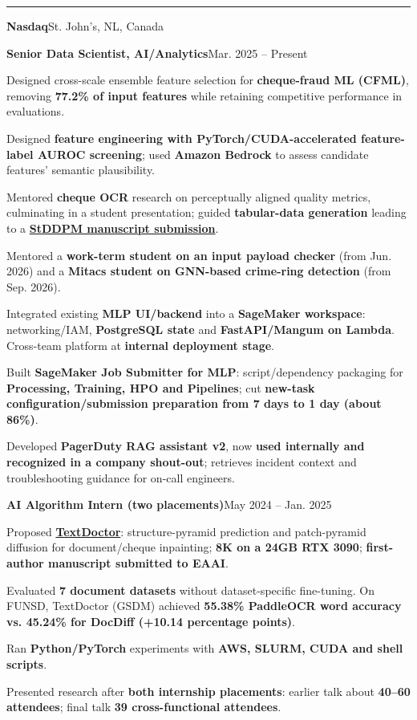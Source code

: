 \documentclass[11pt,letterpaper]{article}
\newcommand{\cvsection}[1]{\par\addvspace{6pt}{\large\bfseries #1}\par\vspace{1pt}\hrule\vspace{3pt}}
\newcommand{\company}[2]{\par\addvspace{4pt}\textbf{#1}\hfill{\small\color{muted}#2}\par}
\newcommand{\position}[2]{\par\addvspace{2pt}\textbf{#1}\hfill{\small #2}\par}
\newenvironment{points}{\begin{list}{\textbullet}{\setlength{\leftmargin}{12pt}\setlength{\itemsep}{1.2pt}\setlength{\parsep}{0pt}\setlength{\topsep}{1.5pt}\setlength{\partopsep}{0pt}}}{\end{list}}
\begin{document}
\cvsection{Professional Experience}
\company{Nasdaq}{St. John's, NL, Canada}
\position{Senior Data Scientist, AI/Analytics}{Mar. 2025 -- Present}
\begin{points}
\item Designed cross-scale ensemble feature selection for \textbf{cheque-fraud ML (CFML)}, removing \textbf{77.2\% of input features} while retaining competitive performance in evaluations.
\item Designed \textbf{feature engineering with PyTorch/CUDA-accelerated feature-label AUROC screening}; used \textbf{Amazon Bedrock} to assess candidate features' semantic plausibility.
\item Mentored \textbf{cheque OCR} research on perceptually aligned quality metrics, culminating in a student presentation; guided \textbf{tabular-data generation} leading to a \href{https://doi.org/10.21203/rs.3.rs-7624993/v1}{\textbf{StDDPM manuscript submission}}.
\item Mentored a \textbf{work-term student on an input payload checker} (from Jun. 2026) and a \textbf{Mitacs student on GNN-based crime-ring detection} (from Sep. 2026).
\item Integrated existing \textbf{MLP UI/backend} into a \textbf{SageMaker workspace}: networking/IAM, \textbf{PostgreSQL state} and \textbf{FastAPI/Mangum on Lambda}. Cross-team platform at \textbf{internal deployment stage}.
\item Built \textbf{SageMaker Job Submitter for MLP}: script/dependency packaging for \textbf{Processing, Training, HPO and Pipelines}; cut \textbf{new-task configuration/submission preparation from 7 days to 1 day (about 86\%)}.
\item Developed \textbf{PagerDuty RAG assistant v2}, now \textbf{used internally and recognized in a company shout-out}; retrieves incident context and troubleshooting guidance for on-call engineers.
\end{points}

\position{AI Algorithm Intern (two placements)}{May 2024 -- Jan. 2025}
\begin{points}
\item Proposed \href{https://arxiv.org/abs/2503.04021}{\textbf{TextDoctor}}: structure-pyramid prediction and patch-pyramid diffusion for document/cheque inpainting; \textbf{8K on a 24GB RTX 3090}; \textbf{first-author manuscript submitted to EAAI}.
\item Evaluated \textbf{7 document datasets} without dataset-specific fine-tuning. On FUNSD, TextDoctor (GSDM) achieved \textbf{55.38\% PaddleOCR word accuracy vs. 45.24\% for DocDiff (+10.14 percentage points)}.
\item Ran \textbf{Python/PyTorch} experiments with \textbf{AWS, SLURM, CUDA and shell scripts}.
\item Presented research after \textbf{both internship placements}: earlier talk about \textbf{40--60 attendees}; final talk \textbf{39 cross-functional attendees}.
\end{points}
\end{document}

